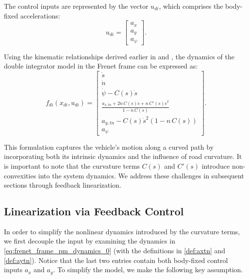 The control inputs are represented by the vector \(u_{di}\), which comprises the body-fixed accelerations:
\begin{equation}
	u_{di} = \begin{bmatrix}
		a_x \\
		a_y \\
		a_\psi
	\end{bmatrix}.
\end{equation}

Using the kinematic relationships derived earlier in  and , the dynamics of the double integrator model in the Frenet frame can be expressed as:
\begin{equation}
	\label{eq:frenet_frame_pm_dynamics_0}
	f_{di}(x_{di}, u_{di}) = \begin{bmatrix}
		\dot{s}                                                                                \\
		\dot{n}                                                                                \\
		\dot{\psi} - C(s)\dot{s}                                                               \\
		\displaystyle \frac{a_{x,tn} + 2\dot{n}\,C(s)\dot{s} + n\,C'(s)\dot{s}^2}{1 - n\,C(s)} \\
		a_{y,tn} - C(s)\dot{s}^2(1 - n\,C(s))                                                  \\
		a_\psi
	\end{bmatrix}.
\end{equation}

This formulation captures the vehicle's motion along a curved path by incorporating both its intrinsic dynamics and the influence of road curvature.
It is important to note that the curvature terms \(C(s)\) and \(C'(s)\) introduce non-convexities into the system dynamics.
We address these challenges in subsequent sections through feedback linearization.

\subsection{Linearization via Feedback Control} \label{subsec:constraints}

In order to simplify the nonlinear dynamics introduced by the curvature terms, we first decouple the input by examining the dynamics in
\eqref{eq:frenet_frame_pm_dynamics_0} (with the definitions in \eqref{def:axtn} and \eqref{def:aytn}).
Notice that the last two entries contain both body-fixed control inputs \(a_x\) and \(a_y\).
To simplify the model, we make the following key assumption.


